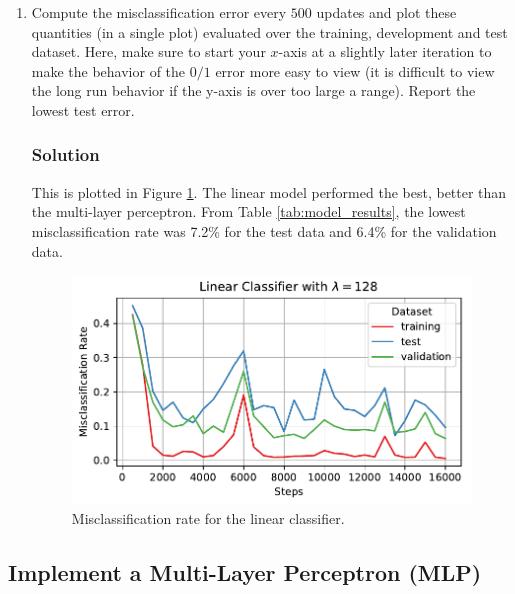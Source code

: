\documentclass[letterpaper,11pt]{article}
\begin{document}
\begin{enumerate}
\item Compute the misclassification error every $500$ updates and plot these
  quantities (in a single plot) evaluated over the training, development and
  test dataset. Here, make sure to start your $x$-axis at a slightly later
  iteration to make the behavior of the $0/1$ error more easy to view (it is
  difficult to view the long run behavior if the y-axis is over too large a
  range). Report the lowest test error.

  \subsubsection*{Solution}

  This is plotted in Figure \ref{fig:linear_misclassification}. The linear model
  performed the best, better than the multi-layer perceptron. From Table
  \ref{tab:model_results}, the lowest misclassification rate was 7.2\% for the
  test data and 6.4\% for the validation data.

  \begin{figure}
    \centering
    \includegraphics{problem6/linear_misclassification.pdf}
    \caption{Misclassification rate for the linear classifier.}
    \label{fig:linear_misclassification}
  \end{figure}
\end{enumerate}

\subsection*{Implement a Multi-Layer Perceptron (MLP)}
\end{document}
